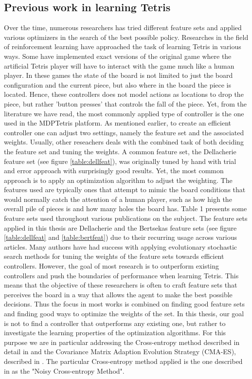 \subsection{Previous work in learning Tetris\label{prevWork}}
Over the time, numerous researchers has tried different feature 
sets and applied various optimizers in the search of the best 
possible policy. Researches in the field
of reinforcement learning have approached the task of learning Tetris
in various ways. Some have implemented exact versions of the original game
where the artificial Tetris player will have to interact with the 
game much like a human player. In these games the state of the board is not limited
to just the board configuration and the current piece, but also where in the 
board the piece is located. Hence, these controllers does not model actions 
as locations to drop the piece, but rather 'button presses' that controls the
fall of the piece. Yet, from the literature we have read, the most commonly applied 
type of controller is the one used in the MDPTetris platform. As mentioned earlier,
to create an efficient controller one can adjust two settings, namely the feature set 
and the associated weights. 
Usually, other reseachers deals with the combined task of both
deciding the feature set and tuning the weights. A common 
feature set, the Dellacherie feature set (see figure \ref{table:dellfeat}),
was originally tuned by hand with trial and error approach with surprisingly 
good results. Yet, the most common approach is to apply an optimization 
algorithm to adjust the weighting.
The features used are typically
ones that attempt to mimic the board conditions that would
normally catch the attention of a human player, such as
how high the overall pile of pieces is and how many holes 
the board has. Table 1 \citep{scherrer2009:b}
presents some feature sets used throughout various publications
on the subject. The feature sets applied in this thesis are 
Dellacherie and the Bertsekas feature sets 
(see figure \ref{table:dellfeat} and \ref{table:bertfeat}) due 
to their recurring usage across various articles.
Many authors have had success
with applying evolutionary stochastic search methods for tuning 
the weights of the feature sets towards
efficient controllers. However, the goal of most research 
is to outperform existing controllers and push the boundaries
of performance when learning Tetris. This means that the objective of
these researchers is often to craft feature sets that perceives the 
board in a way that allows the agent to make the best possible decisions.
Thus the focus in most works is combined on finding good feature sets and 
finding good ways to optimize the weights of the set. In this thesis,
our goal is not to find a controller that outperforms any existing one,
but rather to investigate the learning properties of the optimization algorithms.
For this purpose
we are in particular addressing the
Cross-entropy method described in detail in \citep{cetut2014} and the
Covariance Matrix Adaption Evolution Strategy (CMA-ES), described 
in \citep{hansen2011}. The particular Cross-entropy method applied 
is the one described in \citep{szita:06} as the "Noisy Cross-entropy Method".\\

